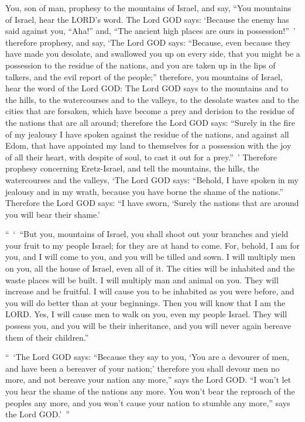 \mychapter{} \myverse*{}You, son of man, prophesy to the mountains of Israel, and say,
“You mountains of Israel, hear the LORD’s word.
\myverse{}The Lord GOD says: ‘Because the enemy has said against you, “Aha!” and, “The
ancient high places are ours in possession!” ’
\myverse{}therefore prophesy, and say, ‘The Lord GOD says: “Because, even because they
have made you desolate, and swallowed you up on every side, that you might be a possession to the residue
of the nations, and you are taken up in the lips of talkers, and the evil report of the people;”
\myverse{}therefore, you mountains of Israel, hear the word of the Lord GOD: The Lord
GOD says to the mountains and to the hills, to the watercourses and to the valleys, to the desolate wastes
and to the cities that are forsaken, which have become a prey and derision to the residue of the nations
that are all around;
\myverse{}therefore the Lord GOD says: “Surely in the fire of my jealousy I have spoken
against the residue of the nations, and against all Edom, that have appointed my land to themselves for
a possession with the joy of all their heart, with despite of soul, to cast it out for a prey.” ’
\myverse{}Therefore prophesy concerning Eretz-Israel, and tell the mountains, the hills,
the watercourses and the valleys, ‘The Lord GOD says: “Behold, I have spoken in my jealousy and in my
wrath, because you have borne the shame of the nations.”
\myverse{}Therefore the Lord GOD says: “I have sworn, ‘Surely the nations that are around
you will bear their shame.’

\myverse{}“ ‘ “But you, mountains of Israel, you shall shoot out your branches
and yield your fruit to my people Israel; for they are at hand to come.
\myverse{}For, behold, I am for you, and I will come to you, and you will be tilled and
sown.
\myverse{}I will multiply men on you, all the house of Israel, even all of it. The
cities will be inhabited and the waste places will be built.
\myverse{}I will multiply man and animal on you. They will increase and be fruitful.
I will cause you to be inhabited as you were before, and you will do better than at your beginnings. Then
you will know that I am the LORD.
\myverse{}Yes, I will cause men to walk on you, even my people Israel. They will possess
you, and you will be their inheritance, and you will never again bereave them of their children.”

\myverse{}“ ‘The Lord GOD says: “Because they say to you, ‘You are a devourer
of men, and have been a bereaver of your nation;’
\myverse{}therefore you shall devour men no more, and not bereave your nation any more,”
says the Lord GOD.
\myverse{}“I won’t let you hear the shame of the nations any more. You won’t bear the
reproach of the peoples any more, and you won’t cause your nation to stumble any more,” says the Lord
GOD.’ ”


